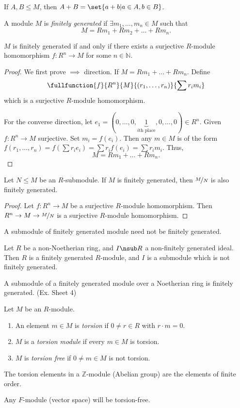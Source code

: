 If \(A, B \leq M\), then \(A + B = \set{a + b | a \in A, b \in B}\).
\begin{definition}{}{}
    A module \(M\) is \textit{finitely generated} if \(\exists m_1,\dots, m_n \in M\) such that
    \[M = Rm_1 + Rm_2 + \dots + Rm_n.\]
\end{definition}
\begin{lemma}{}{}
    \(M\) is finitely generated if and only if there exists a surjective \(R\)-module homomorphism \(f: R^n \to M\) for some \(n \in \mathbb{N}\).
\end{lemma}
\begin{proof}
    We first prove \(\implies\) direction. If \(M = Rm_1 + \dots + Rm_n\). Define
    \[
        \fullfunction{f}{R^n}{M}{(r_1,\dots,r_n)}{\sum r_i m_i}
    \]
    which is a surjective \(R\)-module homomorphism.

    For the converse direction, let \(e_1 = (0,\dots,0,\underbrace{1}_{i\text{th place}},0,\dots,0) \in R^n\). Given \(f: R^n \to M\) surjective. Set \(m_i = f(e_i)\). Then any \(m \in M\) is of the form \(f(r_1, \dots, r_n) = f(\sum r_i e_i) = \sum r_i f(e_i) = \sum r_i m_i\). Thus,
    \[
        M = Rm_1 + \dots + Rm_n.
    \]
\end{proof}
\begin{corollary}{}{}
    Let \(N \leq M\) be an \(R\)-submodule. If \(M\) is finitely generated, then \(\nicefrac{M}{N}\) is also finitely generated.
\end{corollary}
\begin{proof}
    Let \(f: R^n \to M\) be a surjective \(R\)-module homomorphism. Then \(R^n \to M \to \nicefrac{M}{N}\) is a surjective \(R\)-module homomorphism.
\end{proof}
\begin{example}
    A submodule of finitely generated module need not be finitely generated.

    Let \(R\) be a non-Noetherian ring, and \(I \nsub R\) a non-finitely generated ideal. Then \(R\) is a finitely generated \(R\)-module, and \(I\) is a submodule which is not finitely generated.
\end{example}
\begin{remark}
    A submodule of a finitely generated module over a Noetherian ring is finitely generated. (Ex. Sheet 4)
\end{remark}
\begin{definition}{}{}
    Let \(M\) be an \(R\)-module.
    \begin{enumerate}
        \item An element \(m \in M\) is \textit{torsion} if \(0 \neq r \in R\) with \(r \cdot m = 0\).
        \item \(M\) is a \textit{torsion module} if every \(m \in M\) is torsion.
        \item \(M\) is \textit{torsion free} if \(0 \neq m \in M\) is not torsion.
    \end{enumerate}
\end{definition}
\begin{example}
    The torsion elements in a \(\mathbb{Z}\)-module (Abelian group) are the elements of finite order.

    Any \(F\)-module (vector space) will be torsion-free.
\end{example}